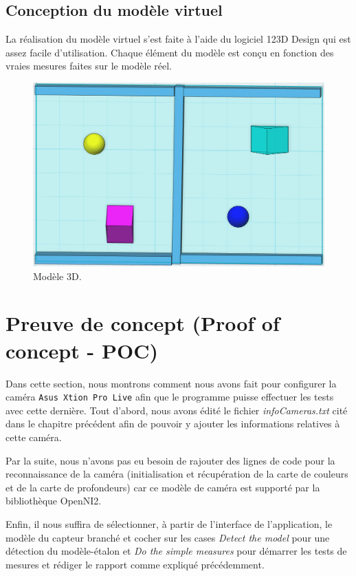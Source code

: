 \documentclass[a4paper, 12pt]{book}
\newcounter{program}[subsection]
\begin{document}
\subsection{Conception du modèle virtuel}
La réalisation du modèle virtuel s'est faite à l'aide du logiciel 123D Design qui est assez facile d'utilisation. Chaque élément du modèle est conçu en fonction des vraies mesures faites sur le modèle réel.
\begin{center}
	\begin{figure}[htbp]
  		\hspace{0.37cm}
 		\includegraphics[scale=0.35]{images/3DModel.png} \hspace{2cm}
  		\caption{Modèle 3D.\label{fig-model}}
	\end{figure}
\end{center}

\section{Preuve de concept (Proof of concept - POC)}
Dans cette section, nous montrons comment nous avons fait pour configurer la caméra \texttt{Asus Xtion Pro Live} afin que le programme puisse effectuer les tests avec cette dernière.
Tout d'abord, nous avons édité le fichier \emph{infoCameras.txt} cité dans le chapitre précédent afin de pouvoir y ajouter les informations relatives à cette caméra.
\par Par la suite, nous n'avons pas eu besoin de rajouter des lignes de code pour la reconnaissance de la caméra (initialisation et récupération de la carte de couleurs et de la carte de profondeurs) car ce modèle de caméra est supporté par la bibliothèque OpenNI2.
\par Enfin, il nous suffira de sélectionner, à partir de l'interface de l'application, le modèle du capteur branché et cocher sur les cases \emph{Detect the model} pour une détection du modèle-étalon et \emph{Do the simple measures} pour démarrer les tests de mesures et rédiger le rapport comme expliqué précédemment. 
\end{document}
